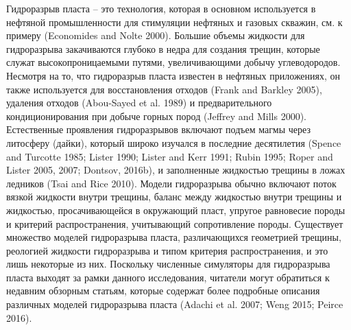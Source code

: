 \documentclass[main.tex]{subfiles}
\begin{document}
Гидроразрыв пласта -- это технология, которая в основном используется в нефтяной промышленности для стимуляции нефтяных и газовых скважин, см. к примеру (Economides and Nolte 2000).
Большие объемы жидкости для гидроразрыва закачиваются глубоко в недра для создания трещин, которые служат высокопроницаемыми путями, увеличивающими добычу углеводородов.
Несмотря на то, что гидроразрыв пласта известен в нефтяных приложениях, он также используется для восстановления отходов (Frank and Barkley 2005), удаления отходов (Abou-Sayed et al. 1989) и предварительного кондиционирования при добыче горных пород (Jeffrey and Mills 2000).
Естественные проявления гидроразрывов включают подъем магмы через литосферу (дайки), который широко изучался в последние десятилетия (Spence and Turcotte 1985; Lister 1990; Lister and Kerr 1991; Rubin 1995; Roper and Lister 2005, 2007; Dontsov, 2016b), и заполненные жидкостью трещины в ложах ледников (Tsai and Rice 2010).
Модели гидроразрыва обычно включают поток вязкой жидкости внутри трещины, баланс между жидкостью внутри трещины и жидкостью, просачивающейся в окружающий пласт, упругое равновесие породы и критерий распространения, учитывающий сопротивление породы.
Существует множество моделей гидроразрыва пласта, различающихся геометрией трещины, реологией жидкости гидроразрыва и типом критерия распространения, и это лишь некоторые из них.
Поскольку численные симуляторы для гидроразрыва пласта выходят за рамки данного исследования, читатели могут обратиться к недавним обзорным статьям, которые содержат более подробные описания различных моделей гидроразрыва пласта (Adachi et al. 2007; Weng 2015; Peirce 2016).
\end{document}

